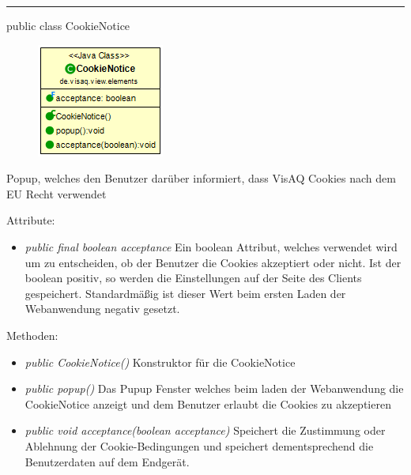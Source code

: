 \clearpage %
\rule{\textwidth}{0.4pt}
public class CookieNotice

\begin{minipage}{0.3\textwidth}
    \begin{figure}[H]
        \includegraphics[scale = 0.6]{media/frontend/view/de.view.elements/CookieNotice_Class.png}
    \end{figure}
    \end{minipage} \hfill
    \begin{minipage}{0.6\textwidth}
Popup, welches den Benutzer darüber informiert, dass VisAQ Cookies nach dem EU Recht verwendet
\end{minipage}

Attribute:
\begin{itemize}
    \item \emph{public final boolean acceptance} Ein boolean Attribut, welches verwendet wird um zu entscheiden, ob der Benutzer die Cookies akzeptiert oder nicht. Ist der boolean positiv, so werden die Einstellungen auf der Seite des Clients gespeichert. Standardmäßig ist dieser Wert beim ersten Laden der Webanwendung negativ gesetzt.
\end{itemize}
Methoden:
\begin{itemize}
    \item \emph{public CookieNotice()} Konstruktor für die CookieNotice
    \item \emph{public popup()} Das Pupup Fenster welches beim laden der Webanwendung die CookieNotice anzeigt und dem Benutzer erlaubt die Cookies zu akzeptieren
    \item \emph{public void acceptance(boolean acceptance)} Speichert die Zustimmung oder Ablehnung der Cookie-Bedingungen und speichert dementsprechend die Benutzerdaten auf dem Endgerät.
\end{itemize}
